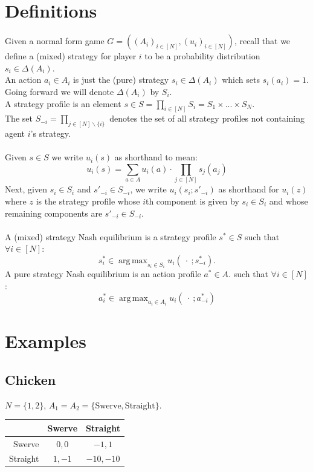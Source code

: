 \documentclass[11pt]{article}
\title{}
\date{}
\DeclareMathOperator*{\argmax}{arg\,max}
\theoremstyle{definition}
\theoremstyle{plain}
\begin{document}
\section{Definitions}

Given a normal form game  $G=((A_i)_{i \in [N]},(u_i)_{i \in [N]})$, recall that we define a (mixed) strategy for player $i$ to be a probability distribution $s_i \in \Delta(A_i)$. 
\\
An action $a_i \in A_i$ is just the (pure) strategy $s_i \in \Delta(A_i)$ which sets $s_i(a_i)=1$.
\\
Going forward we will denote $\Delta(A_i)$ by $S_i$.
\\
A strategy profile is an element $s \in S=\prod_{i \in [N]} S_i=S_1 \times ...\times S_N$.
\\
The set $S_{-i}=\prod_{j \in [N]\backslash\{i\}}$ denotes the set of all strategy profiles not containing agent $i$'s strategy.
\\
\\
Given $s \in S$ we write $u_i(s)$ as shorthand to mean:
$$u_i(s)=\sum_{a \in A} u_i(a) \cdot \prod_{j \in [N]} s_j(a_j)$$
Next, given $s_i \in S_i$ and $s'_{-i} \in S_{-i}$, we write $u_i(s_i;s'_{-i})$ as shorthand for $u_i(z)$ where $z$ is the strategy profile whose $i$th component is given by $s_i\in S_i$ and whose remaining components are  $s'_{-i} \in S_{-i}$.
\\
\\
A (mixed) strategy Nash equilibrium is a strategy profile $s^* \in S$ such that $\forall i \in [N]$:
$$s^*_i \in \argmax_{s_i \in S_i} u_i(\ \cdot \ ;s^*_{-i}).$$
A pure strategy Nash equilibrium is an action profile $a^* \in A$. such that $\forall i \in [N]$:
$$a^*_i \in \argmax_{a_i \in A_i} u_i(\ \cdot \ ; a^*_{-i})$$

\section{Examples}

\subsection*{Chicken}

$N = \{1, 2\}$, $A_1 = A_2 = \{\text{Swerve}, \text{Straight}\}$.

\begin{center}
\begin{tabular}{r|c|c|}
  & Swerve & Straight \\\hline
Swerve & $0, 0$ & $-1, 1$ \\\hline
Straight & $1, -1$ & $-10, -10$ \\\hline
\end{tabular}
\end{center}
\end{document}
